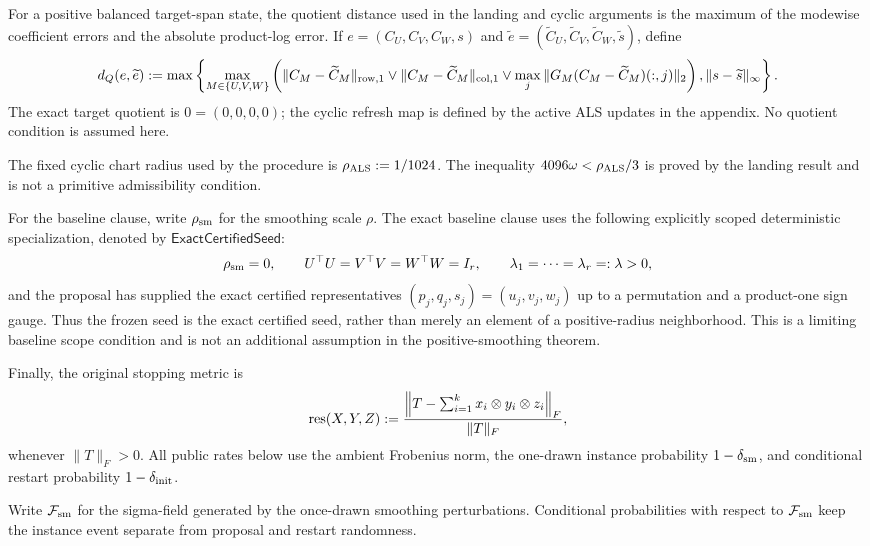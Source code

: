For a positive balanced target-span state, the quotient distance used in the
landing and cyclic arguments is the maximum of the modewise coefficient
errors and the absolute product-log error.  If
$e=(C_U,C_V,C_W,s)$ and $\widetilde e=(\widetilde C_U,\widetilde C_V,
\widetilde C_W,\widetilde s)$, define
\[
d_Q(e,\widetilde e):=\max\left\{
\max_{M\in\{U,V,W\}}\left(
\|C_M-\widetilde C_M\|_{\rm row,1}\vee
\|C_M-\widetilde C_M\|_{\rm col,1}\vee
\max_j\|G_M(C_M-\widetilde C_M)(:,j)\|_2\right),
\|s-\widetilde s\|_\infty\right\}.
\]
The exact target quotient is $0=(0,0,0,0)$; the cyclic refresh map is
defined by the active ALS updates in the appendix.  No quotient condition is
assumed here.

The fixed cyclic chart radius used by the procedure is
$\rho_{\rm ALS}:=1/1024$.  The inequality
$4096\omega<\rho_{\rm ALS}/3$ is proved by the landing result and is not a
primitive admissibility condition.

For the baseline clause, write $\rho_{\rm sm}$ for the smoothing scale $\rho$.
The exact baseline clause uses the following explicitly scoped deterministic
specialization, denoted by $\mathsf{ExactCertifiedSeed}$:
\[
\rho_{\rm sm}=0,\qquad U^\top U=V^\top V=W^\top W=I_r,\qquad
\lambda_1=\cdots=\lambda_r=:\lambda>0,
\]
and the proposal has supplied the exact certified representatives
$(p_j,q_j,s_j)=(u_j,v_j,w_j)$ up to a permutation and a product-one sign
gauge.  Thus the frozen seed is the exact certified seed, rather than merely
an element of a positive-radius neighborhood.  This is a limiting baseline
scope condition and is not an additional assumption in the positive-smoothing
theorem.

Finally, the original stopping metric is
\[
 \operatorname{res}(X,Y,Z):=
 {\left\|T-\sum_{i=1}^k x_i\otimes y_i\otimes z_i\right\|_F\over\|T\|_F},
\]
whenever $\|T\|_F>0$.  All public rates below use the ambient Frobenius norm,
the one-drawn instance probability $1-\delta_{\rm sm}$, and conditional
restart probability $1-\delta_{\rm init}$.

Write $\mathcal F_{\rm sm}$ for the sigma-field generated by the once-drawn
smoothing perturbations. Conditional probabilities with respect to
$\mathcal F_{\rm sm}$ keep the instance event separate from proposal and
restart randomness.
